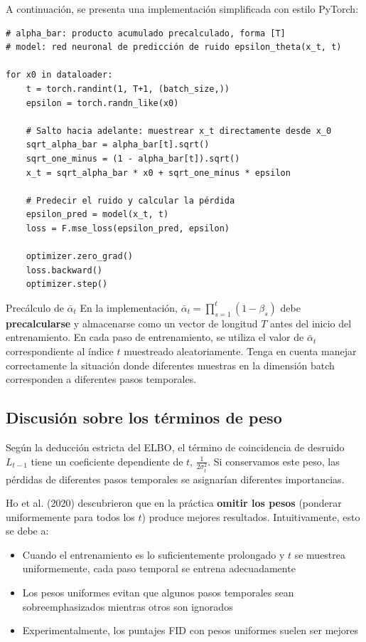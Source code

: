 A continuación, se presenta una implementación simplificada con estilo PyTorch:

\begin{lstlisting}[caption={Bucle central del entrenamiento de DDPM}, label=lst:train]
# alpha_bar: producto acumulado precalculado, forma [T]
# model: red neuronal de predicción de ruido epsilon_theta(x_t, t)

for x0 in dataloader:
    t = torch.randint(1, T+1, (batch_size,))
    epsilon = torch.randn_like(x0)

    # Salto hacia adelante: muestrear x_t directamente desde x_0
    sqrt_alpha_bar = alpha_bar[t].sqrt()
    sqrt_one_minus = (1 - alpha_bar[t]).sqrt()
    x_t = sqrt_alpha_bar * x0 + sqrt_one_minus * epsilon

    # Predecir el ruido y calcular la pérdida
    epsilon_pred = model(x_t, t)
    loss = F.mse_loss(epsilon_pred, epsilon)

    optimizer.zero_grad()
    loss.backward()
    optimizer.step()
\end{lstlisting}

\begin{warningbox}{Precálculo de $\bar{\alpha}_t$}
En la implementación, $\bar{\alpha}_t = \prod_{s=1}^{t}(1-\beta_s)$ debe \textbf{precalcularse} y almacenarse como un vector de longitud $T$ antes del inicio del entrenamiento. En cada paso de entrenamiento, se utiliza el valor de $\bar{\alpha}_t$ correspondiente al índice $t$ muestreado aleatoriamente. Tenga en cuenta manejar correctamente la situación donde diferentes muestras en la dimensión batch corresponden a diferentes pasos temporales.
\end{warningbox}

\subsection{Discusión sobre los términos de peso}

Según la deducción estricta del ELBO, el término de coincidencia de desruido $L_{t-1}$ tiene un coeficiente dependiente de $t$, $\frac{1}{2\sigma_t^2}$. Si conservamos este peso, las pérdidas de diferentes pasos temporales se asignarían diferentes importancias.

Ho et al. (2020) descubrieron que en la práctica \textbf{omitir los pesos} (ponderar uniformemente para todos los $t$) produce mejores resultados. Intuitivamente, esto se debe a:

\begin{itemize}
    \item Cuando el entrenamiento es lo suficientemente prolongado y $t$ se muestrea uniformemente, cada paso temporal se entrena adecuadamente
    \item Los pesos uniformes evitan que algunos pasos temporales sean sobreemphasizados mientras otros son ignorados
    \item Experimentalmente, los puntajes FID con pesos uniformes suelen ser mejores
\end{itemize}

